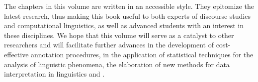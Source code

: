 \documentclass[output=paper]{langsci/langscibook.cls}
\begin{document}
The chapters in this volume are written in an accessible style. They epitomize the latest research, thus making this book useful to both experts of discourse studies and computational linguistics, as well as advanced students with an interest in these disciplines. We hope that this volume will serve as a catalyst to other researchers and will facilitate further advances in the development of cost-effective annotation procedures, in the application of statistical techniques for the analysis of linguistic phenomena, the elaboration of new methods for data interpretation in  linguistics and .
		
	
	
	
	
	
	
%	 
%	

{\sloppy
\printbibliography[heading=subbibliography,notkeyword=this] 
}
\end{document}
